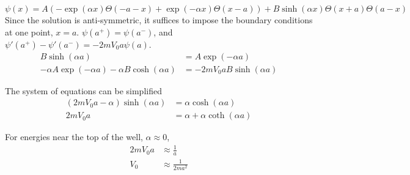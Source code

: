 \begin{sol}
\begin{enumerate}[label=\textbf{(\alph*)}]
    \begin{equation}
        \psi(x)=A(-\exp(\alpha x)\Theta(-a-x)+\exp(-\alpha x)\Theta(x-a))+B\sinh(\alpha x)\Theta(x+a)\Theta(a-x)
    \end{equation}
    Since the solution is anti-symmetric, it suffices to impose the boundary conditions at one point, $x=a$.
    $\psi(a^+)=\psi(a^-)$, and $\psi'(a^+)-\psi'(a^-)=-2mV_0a\psi(a)$.
    \begin{align}
        B\sinh(\alpha a)&=A\exp(-\alpha a)\\
        -\alpha A \exp(-\alpha a)-\alpha B\cosh(\alpha a)&=-2mV_0aB\sinh(\alpha a)
    \end{align}
    
    The system of equations can be  simplified
    \begin{equation}
        \begin{aligned}
            (2mV_0a-\alpha)\sinh(\alpha a)&=\alpha \cosh(\alpha a)\\
            2mV_0a&=\alpha+\alpha\coth(\alpha a)
        \end{aligned}
    \end{equation}
    
   For energies near the top of the well, $\alpha\approx 0$,
   \begin{equation}
       \begin{aligned}
            2mV_0a&\approx\frac{1}{a}\\
            V_0&\approx\frac{1}{2ma^2}
       \end{aligned}
   \end{equation}	
\end{enumerate}
\end{sol}